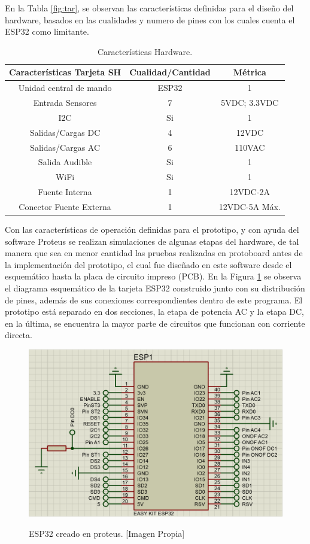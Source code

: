 En la Tabla \ref{fig:tar}, se observan las características definidas para el diseño del hardware, basados en las cualidades y numero de pines con los cuales cuenta el ESP32 como limitante.\\


\begin{table}[H]
	\begin{center}
		\caption{Características Hardware.}
		\label{table:carac}
		\begin{tabular}{|c|c|c|}
			\hline 
			\textbf{Características Tarjeta SH} & \textbf{Cualidad/Cantidad} & \textbf{Métrica} \\ 
			\hline 
			Unidad central de mando & ESP32 & 1\\ 
			\hline 
			Entrada Sensores & 7 & 5VDC; 3.3VDC\\
			\hline 
			I2C & Si & 1\\
			\hline 
			Salidas/Cargas DC & 4 & 12VDC\\
			\hline 
			Salidas/Cargas AC & 6 & 110VAC\\
			\hline 
			Salida Audible & Si & 1\\
			\hline 
			WiFi & Si & 1\\ 
			\hline 
			Fuente Interna & 1 & 12VDC-2A\\
			\hline
			Conector Fuente Externa & 1 & 12VDC-5A Máx.\\
			\hline
		\end{tabular} 
	\end{center}
\end{table}

Con las características de operación definidas para el prototipo, y con ayuda del software Proteus se realizan simulaciones de algunas etapas del hardware, de tal manera que sea en menor cantidad las pruebas realizadas en protoboard antes de la implementación del prototipo, el cual fue diseñado en este software desde el esquemático hasta la placa de circuito impreso (PCB). En la Figura \ref{fig:esp32} se observa el diagrama esquemático de la tarjeta ESP32 construido junto con su distribución de pines, además de sus conexiones correspondientes dentro de este programa. El prototipo está separado en dos secciones, la etapa de potencia AC y la etapa DC, en la última, se encuentra la mayor parte de circuitos que funcionan con corriente directa.\\

\begin{figure}[H]
	\centering
	\caption[ESP32 creado en proteus.]{ESP32 creado en proteus. [Imagen Propia]}
	\includegraphics[width=0.5\linewidth]{Imagenes/ESP32}	
	\label{fig:esp32}
\end{figure}

